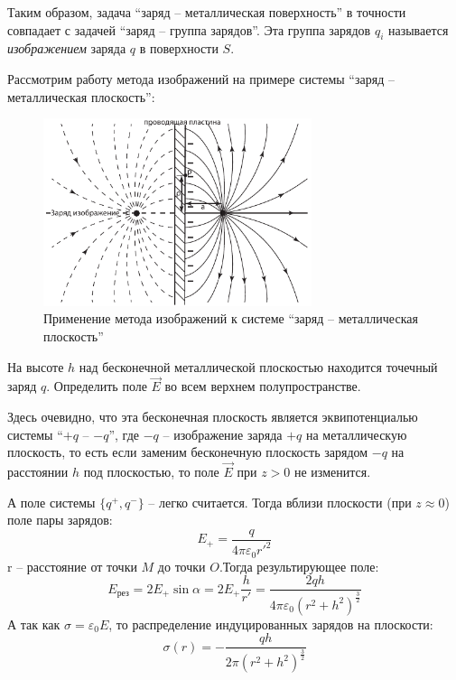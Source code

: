     Таким образом, задача ``заряд -- металлическая поверхность'' в точности
    совпадает с задачей ``заряд -- группа зарядов''. Эта группа зарядов
    \( q_i \) называется \textit{изображением} заряда \( q \)  в поверхности
    \( S \).

    Рассмотрим работу метода изображений на примере системы ``заряд --
    металлическая плоскость'':
    \begin{figure}[b!]
        \center
        \includegraphics[width=0.7\textwidth]{lec04/flat_image.pdf}
        \caption{Применение метода изображений к системе ``заряд -- 
            металлическая плоскость''}
    \end{figure}
    \begin{example}
        На высоте \( h \) над бесконечной металлической плоскостью находится
        точечный заряд \( q \). Определить поле \( \vec{E} \) во всем верхнем
        полупространстве.
    \end{example}

    \begin{solution}
        Здесь очевидно, что эта бесконечная плоскость является эквипотенциалью 
        системы “\( +q \) -- \( -q \)”, где \( -q \) -- изображение заряда
        \( +q \) на металлическую плоскость, то есть если заменим бесконечную 
        плоскость зарядом \( -q \) на расстоянии \( h \) под плоскостью, то
        поле \( \vec{E} \) при \( z > 0 \) не изменится.

        А поле системы \( \{ q^{+}, q^{-} \} \) -- легко считается. Тогда вблизи 
        плоскости (при \( z \approx 0 \)) поле пары зарядов:
        \[
            E_{+} = \frac{q}{4\pi\varepsilon_0 {r'}^2}
        \]
        r -- расстояние от точки \( M \) до точки \( O \).Тогда результирующее
        поле:
        \[
            E_{\textit{рез}} = 2E_{+}\sin\alpha = 2E_{+}\frac{h}{r'} = 
            \frac{2qh}{4\pi\varepsilon_0(r^2 + h^2)^{\frac{3}{2}}}
        \]
        А так как \( \sigma = \varepsilon_0 E \), то распределение
        индуцированных зарядов на плоскости:
        \[
            \sigma(r) = -\frac{qh}{2\pi(r^2+h^2)^{\frac{3}{2}}}
        \]
    \end{solution}

